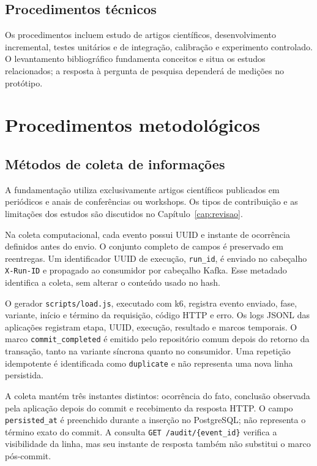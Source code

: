 \subsection{Procedimentos técnicos}
Os procedimentos incluem estudo de artigos científicos, desenvolvimento incremental, testes unitários e de integração, calibração e experimento controlado. O levantamento bibliográfico fundamenta conceitos e situa os estudos relacionados; a resposta à pergunta de pesquisa dependerá de medições no protótipo.

\section{Procedimentos metodológicos}

\subsection{Métodos de coleta de informações}
A fundamentação utiliza exclusivamente artigos científicos publicados em periódicos e anais de conferências ou workshops. Os tipos de contribuição e as limitações dos estudos são discutidos no Capítulo~\ref{cap:revisao}.

Na coleta computacional, cada evento possui UUID e instante de ocorrência definidos antes do envio. O conjunto completo de campos é preservado em reentregas. Um identificador UUID de execução, \texttt{run\_id}, é enviado no cabeçalho \texttt{X-Run-ID} e propagado ao consumidor por cabeçalho Kafka. Esse metadado identifica a coleta, sem alterar o conteúdo usado no hash.

O gerador \texttt{scripts/load.js}, executado com k6, registra evento enviado, fase, variante, início e término da requisição, código HTTP e erro. Os logs JSONL das aplicações registram etapa, UUID, execução, resultado e marcos temporais. O marco \texttt{commit\_completed} é emitido pelo repositório comum depois do retorno da transação, tanto na variante síncrona quanto no consumidor. Uma repetição idempotente é identificada como \texttt{duplicate} e não representa uma nova linha persistida.

A coleta mantém três instantes distintos: ocorrência do fato, conclusão observada pela aplicação depois do commit e recebimento da resposta HTTP. O campo \texttt{persisted\_at} é preenchido durante a inserção no PostgreSQL; não representa o término exato do commit. A consulta \texttt{GET /audit/\{event\_id\}} verifica a visibilidade da linha, mas seu instante de resposta também não substitui o marco pós-commit.

